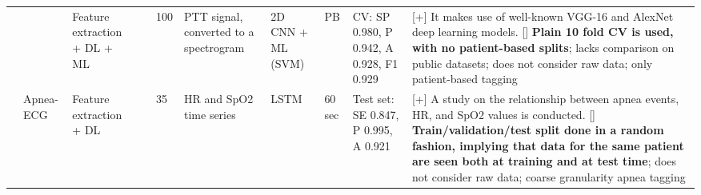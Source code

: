 \documentclass[5p,twocolumn,lefttitle]{elsarticle}
\begin{document}
\begin{table*}[t]
{\begin{tabularx}{2\textwidth}{@{}m{2.5em}p{7em}p{10em}lp{2em}p{12em}p{7em}p{3em}p{17em}X@{}}
                              &                                                         & Feature extraction + DL + ML                                   & \cite{tuncer2019deep}                    & 100           & PTT signal, converted to a spectrogram                                                                             & 2D CNN + ML (SVM)                   & PB                                & CV: SP 0.980, P 0.942, A 0.928, F1 0.929                                                                                                                                             & [+] It makes use of well-known VGG-16 and AlexNet deep learning models. [] \textbf{Plain 10 fold CV is used, with no patient-based splits}; lacks comparison on public datasets; does not consider raw data; only patient-based tagging                                                                                                                                                                                                                                                    \\
            \cmidrule(l){2-10} 
                            & Apnea-ECG                                               & Feature extraction + DL                                        & \cite{pathinarupothi2017single}          & 35            & HR and SpO2 time series                                                                                           & LSTM                                & 60 sec                                     & Test set: SE 0.847, P 0.995, A 0.921                                                                                                                                                    & [+] A study on the relationship between apnea events, HR, and SpO2 values is conducted. [] \textbf{Train/validation/test split done in a random fashion, implying that data for the same patient are seen both at training and at test time}; does not consider raw data; coarse granularity apnea tagging                                                                                                                                               \\
            \cmidrule(l){2-10} 

\end{tabularx}}
\end{table*}
\end{document}
